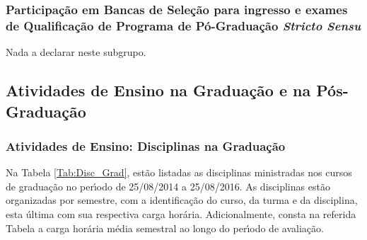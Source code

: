 \documentclass[a4paper,oneside,10pt]{article}
\begin{document}

\subsubsection{Participa\c{c}\~{a}o em Bancas de Sele\c{c}\~{a}o para ingresso e exames de Qualifica\c{c}\~ao de Programa de P\'{o}-Gradua\c{c}\~{a}o \textit{Stricto Sensu}}

Nada a declarar neste subgrupo.
%
%


\subsection{Atividades de Ensino na Graduação e na Pós-Graduação}
\vspace{0.3cm}

\subsubsection{Atividades de Ensino: Disciplinas na Gradua\c{c}\~{a}o}
\vspace{0.3cm}

Na Tabela \ref{Tab:Disc_Grad}, estão listadas as disciplinas ministradas nos cursos de gradua\c{c}\~{a}o no per\'{\i}odo de 25/08/2014 a 25/08/2016. As disciplinas est\~{a}o organizadas por semestre, com a identifica\c{c}\~{a}o do curso, da turma e da disciplina, esta \'{u}ltima com sua respectiva carga hor\'{a}ria. Adicionalmente, consta na referida Tabela a carga hor\'{a}ria m\'{e}dia semestral ao longo do per\'{\i}odo de avalia\c{c}\~{a}o.
\end{document}
